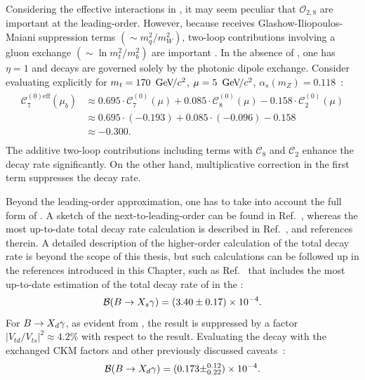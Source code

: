 Considering the effective interactions in , it may seem peculiar that $\mathcal{O}_{2,8}$ are important at the leading-order.
However, because \BtoXsgamma receives Glashow-Iliopoulos-Maiani suppression terms $(\sim m_q^2/m_W^2)$, two-loop contributions involving a gluon exchange $(\sim\ln m_t^2/m_b^2)$ are important \cite{Bertolini:1986th}.
In the absence of \QCD, one has $\eta=1$ and \BtoXsgamma decays are governed solely by the photonic dipole exchange.
Consider evaluating  explicitly for $m_t=170~{\mathrm{\,Ge\kern -0.1em V\!/}c^2}$, $\mu=5~{\mathrm{\,Ge\kern -0.1em V\!/}c^2}$, $\alpha_s(m_Z)=0.118$~\cite{Buras:1998raa}:
\begin{align}
    \begin{split}
        \mathcal{C}_7^{(0)\mathrm{eff}}(\mu_b) &\approx 0.695 \cdot \mathcal{C}_7^{(0)}(\mu) + 0.085 \cdot \mathcal{C}_8^{(0)}(\mu) - 0.158 \cdot \mathcal{C}_2^{(0)}(\mu)  \\ 
                          &\approx 0.695 \cdot (-0.193) + 0.085 \cdot (-0.096) - 0.158\\
                          &\approx -0.300. \\
    \end{split}
\end{align}
The additive \QCD two-loop contributions including terms with $\mathcal{C}_8$ and $\mathcal{C}_2$ enhance the decay rate significantly.
On the other hand, multiplicative \QCD correction in the first term suppresses the decay rate.

Beyond the leading-order approximation, one has to take into account the full form of .
A sketch of the next-to-leading-order can be found in Ref.~\cite{Gambino:2001ew}, whereas the most up-to-date total decay rate calculation is described in Ref.~\cite{Misiak:2020vlo}, and references therein.
A detailed description of the higher-order calculation of the total \BtoXsgamma decay rate is beyond the scope of this thesis, but such calculations can be followed up in the references introduced in this Chapter, such as Ref.~\cite{Misiak:2020vlo} that includes the most up-to-date estimation of the total decay rate of \BtoXsgamma in the \SM:
\begin{equation}\label{eq:btosgamma_theoretical}
    \mathcal{B}(\BtoXsgamma) = (3.40\pm 0.17) \times 10^{-4}.
\end{equation}
\sloppy For $\BtoXdgamma$, as evident from , 
the result is suppressed by a factor \mbox{$|V_{td}/V_{ts}|^2\approx4.2\%$} with respect to the \BtoXsgamma result.
Evaluating the decay with the exchanged CKM factors and other previously discussed caveats~\cite{Misiak:2015xwa}:
\begin{equation}\label{eq:btodgamma_theoretical}
    \mathcal{B}(\BtoXdgamma) = (0.173\pm^{0.12}_{0.22}) \times 10^{-4}.
\end{equation}

